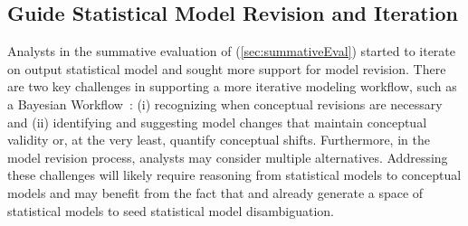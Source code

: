 \subsection{Guide Statistical Model Revision and Iteration}
Analysts in the summative evaluation of \rTisane (\autoref{sec:summativeEval})
started to iterate on \rTisanes output statistical model and sought more
support for model revision. There are two key challenges in supporting a more
iterative modeling workflow, such as a Bayesian
Workflow~\cite{gelman2020bayesianWorkflow}: (i) recognizing when conceptual
revisions are necessary and (ii) identifying and suggesting model changes that
maintain conceptual validity or, at the very least, quantify conceptual shifts.
Furthermore, in the model revision process, analysts may consider multiple
alternatives. Addressing these challenges will likely require reasoning from
statistical models to conceptual models and may benefit from the fact that
\tisane and \rTisane already generate a space of statistical models to seed
statistical model disambiguation. 


